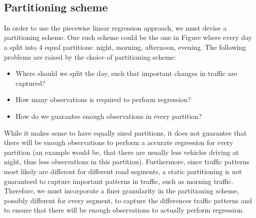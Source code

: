 %
\\
\subsection{Partitioning scheme}\label{patterns:segmentation}
In order to use the piecewise linear regression approach, we must devise a partitioning scheme. One such scheme could be the one in Figure \label{fig:segmented-regression} where every day a split into 4 equal partitions: night, morning, afternoon, evening. The following problems are raised by the choice of partitioning scheme:
\begin{itemize}
	\item Where should we split the day, such that important changes in traffic are captured?
	\item How many observations is required to perform regression?
	\item How do we guarantee enough observations in every partition?
\end{itemize}
While it makes sense to have equally sized partitions, it does not guarantee that there will be enough observations to perform a accurate regression for every partition (an example would be, that there are usually less vehicles driving at night, thus less observations in this partition). Furthermore, since traffic patterns most likely are different for different road segments, a static partitioning is not guaranteed to capture important patterns in traffic, such as morning traffic. Therefore, we must incorporate a finer granularity in the partitioning scheme, possibly different for every segment, to capture the differences traffic patterns and to ensure that there will be enough observations to actually perform regression.

